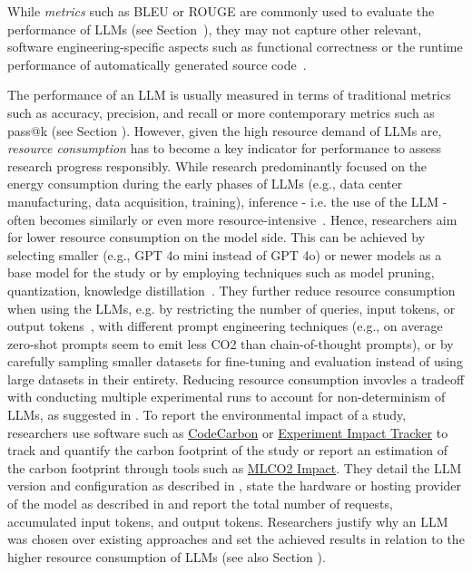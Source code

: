 While \emph{metrics} such as BLEU or ROUGE are commonly used to evaluate the performance of LLMs (see Section~\benchmarksmetrics), they may not capture other relevant, software engineering-specific aspects such as functional correctness or the runtime performance of automatically generated source code~\cite{DBLP:conf/nips/LiuXW023}.

The performance of an LLM is usually measured in terms of traditional metrics such as accuracy, precision, and recall or more contemporary metrics such as pass@k (see Section \benchmarksmetrics).
However, given the high resource demand of LLMs are, \emph{resource consumption} has to become a key indicator for performance to assess research progress responsibly. 
While research predominantly focused on the energy consumption during the early phases of LLMs (e.g., data center manufacturing, data acquisition, training), inference - i.e. the use of the LLM - often becomes similarly or even more resource-intensive~\cite{de2023growing, DBLP:conf/mlsys/WuRGAAMCBHBGGOM22, DBLP:journals/corr/abs-2410-02950, JIANG2024202, mitu2024hidden}.
Hence, researchers  \should aim for lower resource consumption on the model side.
This can be achieved by selecting smaller (e.g., GPT 4o mini instead of GPT 4o) or newer models as a base model for the study or by employing techniques such as model pruning, quantization, knowledge distillation~\cite{mitu2024hidden}.
They \may further reduce resource consumption when using the LLMs, e.g. by restricting the number of queries, input tokens, or output tokens~\cite{mitu2024hidden}, with different prompt engineering techniques (e.g., on average zero-shot prompts seem to emit less CO2 than chain-of-thought prompts), or by carefully sampling smaller datasets for fine-tuning and evaluation instead of using large datasets in their entirety.
Reducing resource consumption invovles a tradeoff with conducting multiple experimental runs to account for non-determinism of LLMs, as suggested in \benchmarksmetrics.
To report the environmental impact of a study, researchers \should use software such as \href{https://github.com/mlco2/codecarbon}{CodeCarbon} or \href{experiment-impact-tracker}{Experiment Impact Tracker} to track and quantify the carbon footprint of the study or report an estimation of the carbon footprint through tools such as \href{https://mlco2.github.io/impact/#about}{MLCO2 Impact}.
They \should detail the LLM version and configuration as described in \modelversion, state the hardware or hosting provider of the model as described in \toolarchitecture and report the total number of requests, accumulated input tokens, and output tokens.
Researchers \must justify why an LLM was chosen over existing approaches and set the achieved results in relation to the higher resource consumption of LLMs (see also Section \benchmarksmetrics).

